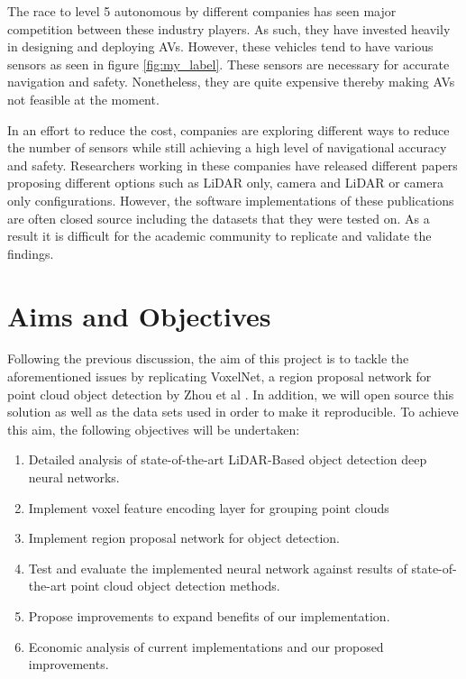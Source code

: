The race to level 5 autonomous by different companies has seen major competition between these industry players. As such, they have invested heavily in designing and deploying AVs. However, these vehicles tend to have various sensors as seen in figure \ref{fig:my_label}. These sensors are necessary for accurate navigation and safety. Nonetheless, they are quite expensive thereby making AVs not feasible at the moment. 

In an effort to reduce the cost, companies are exploring different ways to reduce the number of sensors while still achieving a high level of navigational accuracy and safety. Researchers working in these companies have released different papers proposing different options such as LiDAR only, camera and LiDAR or camera only configurations. However, the software implementations of these publications are often closed source including the datasets that they were tested on. As a result it is difficult for the academic community to replicate and validate the findings. 




\section{Aims and Objectives}
Following the previous discussion, the aim of this project is to tackle the aforementioned issues by replicating VoxelNet, a region proposal network for point cloud object detection by Zhou et al \cite{zhou2017voxelnet}. In addition, we will open source this solution as well as the data sets used in order to make it reproducible. 
To achieve this aim, the following objectives will be undertaken:
\begin{enumerate}
	\item Detailed analysis of state-of-the-art LiDAR-Based object detection deep neural networks.
	\item Implement voxel feature encoding layer for grouping point clouds
	\item Implement region proposal network for object detection.
	\item Test and evaluate the implemented neural network against results of state-of-the-art point cloud object detection methods.
	\item Propose improvements to expand benefits of our implementation.
	\item Economic analysis of current implementations and our proposed improvements. 
\end{enumerate}

